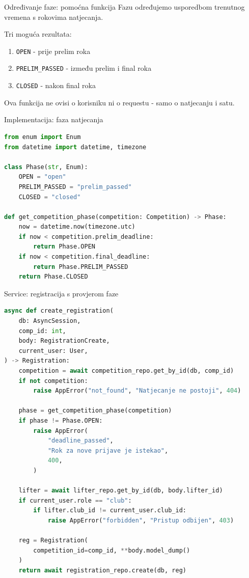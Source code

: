 \begin{frame}{Određivanje faze: pomoćna funkcija}
Fazu određujemo usporedbom trenutnog vremena s rokovima natjecanja.

\vspace{0.6em}
Tri moguća rezultata:
\begin{enumerate}
  \item \texttt{OPEN} - prije prelim roka
  \item \texttt{PRELIM\_PASSED} - između prelim i final roka
  \item \texttt{CLOSED} - nakon final roka
\end{enumerate}

\vspace{0.6em}
Ova funkcija ne ovisi o korisniku ni o requestu - samo o natjecanju i satu.
\end{frame}

\begin{frame}[fragile,shrink=5]{Implementacija: faza natjecanja}
\begin{lstlisting}[language=python]
from enum import Enum
from datetime import datetime, timezone

class Phase(str, Enum):
    OPEN = "open"
    PRELIM_PASSED = "prelim_passed"
    CLOSED = "closed"

def get_competition_phase(competition: Competition) -> Phase:
    now = datetime.now(timezone.utc)
    if now < competition.prelim_deadline:
        return Phase.OPEN
    if now < competition.final_deadline:
        return Phase.PRELIM_PASSED
    return Phase.CLOSED
\end{lstlisting}
\end{frame}

\begin{frame}[fragile, shrink=10]{Service: registracija s provjerom faze}
\begin{lstlisting}[language=python]
async def create_registration(
    db: AsyncSession,
    comp_id: int,
    body: RegistrationCreate,
    current_user: User,
) -> Registration:
    competition = await competition_repo.get_by_id(db, comp_id)
    if not competition:
        raise AppError("not_found", "Natjecanje ne postoji", 404)

    phase = get_competition_phase(competition)
    if phase != Phase.OPEN:
        raise AppError(
            "deadline_passed",
            "Rok za nove prijave je istekao",
            400,
        )

    lifter = await lifter_repo.get_by_id(db, body.lifter_id)
    if current_user.role == "club":
        if lifter.club_id != current_user.club_id:
            raise AppError("forbidden", "Pristup odbijen", 403)

    reg = Registration(
        competition_id=comp_id, **body.model_dump()
    )
    return await registration_repo.create(db, reg)
\end{lstlisting}
\end{frame}

